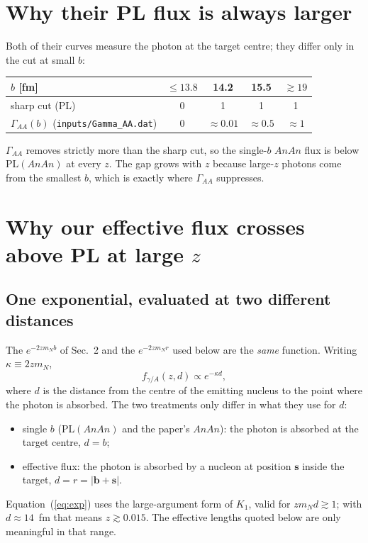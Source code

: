 \documentclass[11pt]{article}
\begin{document}
\section{Why their PL flux is always larger}

Both of their curves measure the photon at the target centre; they differ
only in the cut at small $b$:
\begin{center}
\begin{tabular}{lcccc}
\toprule
$b$ [fm] & $\le 13.8$ & 14.2 & 15.5 & $\gtrsim 19$ \\
\midrule
sharp cut (PL) & 0 & 1 & 1 & 1 \\
$\Gamma_{AA}(b)$ (\texttt{inputs/Gamma\_AA.dat}) & 0 & $\approx0.01$ & $\approx0.5$ & $\approx1$ \\
\bottomrule
\end{tabular}
\end{center}
$\Gamma_{AA}$ removes strictly more than the sharp cut, so the single-$b$
$AnAn$ flux is below PL$(AnAn)$ at every $z$. The gap grows with $z$ because
large-$z$ photons come from the smallest $b$, which is exactly where
$\Gamma_{AA}$ suppresses.

\section{Why our effective flux crosses above PL at large $z$}

\subsection{One exponential, evaluated at two different distances}

The $e^{-2zm_N b}$ of Sec.~2 and the $e^{-2zm_N r}$ used below are the
\emph{same} function. Writing $\kappa \equiv 2 z m_N$,
\begin{equation}
  f_{\gamma/A}(z,d) \propto e^{-\kappa d},
  \label{eq:exp}
\end{equation}
where $d$ is the distance from the centre of the emitting nucleus to the
point where the photon is absorbed. The two treatments only differ in what
they use for $d$:
\begin{itemize}
  \item single $b$ (PL$(AnAn)$ and the paper's $AnAn$): the photon is
    absorbed at the target centre, $d=b$;
  \item effective flux: the photon is absorbed by a nucleon at position
    $\mathbf s$ inside the target, $d=r=|\mathbf b+\mathbf s|$.
\end{itemize}
Equation~(\ref{eq:exp}) uses the large-argument form of $K_1$, valid for
$z m_N d \gtrsim 1$; with $d\approx14$~fm that means $z\gtrsim0.015$. The
effective lengths quoted below are only meaningful in that range.
\end{document}
